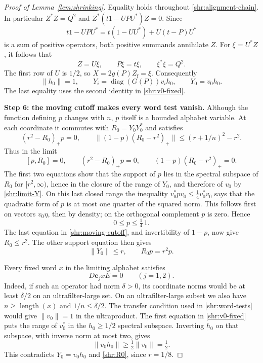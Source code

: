 \begin{proof}[Proof of Lemma~\ref{lem:shrinking}]
Equality holds throughout \eqref{shr:alignment-chain}.  In particular
$Z^*Z=Q^2$ and
$Z^*(t1-UPU^*)Z=0$.  Since
\[
 t1-UPU^*=t(1-UU^*)+U(t-P)U^*
\]
is a sum of positive operators, both positive summands annihilate $Z$.
For $\xi=U^*Z$, it follows that
\begin{equation}\label{shr:alignment}
 Z=U\xi,\qquad P\xi=t\xi,\qquad \xi^*\xi=Q^2.
\end{equation}
The first row of $U$ is $1/2$, so $X=2g(P)Z_{\mathrm f}=\xi$.
Consequently
\begin{equation}\label{shr:limit-Y}
 \|h_0\|=1,\qquad
 Y_i=\operatorname{diag}(G(P))v_i h_0,\qquad
 Y_0=v_0h_0.
\end{equation}
The last equality uses the second identity in \eqref{shr:v0-fixed}.

\medskip
\noindent\textbf{Step 6: the moving cutoff makes every word test vanish.}
Although the function defining $p$ changes with $n$, $p$ itself is a
bounded alphabet variable.  At each coordinate it commutes with
$R_0=Y_0Y_0^*$ and satisfies
\[
 (r^2-R_0)_+p=0,\qquad
 \|(1-p)(R_0-r^2)_+\|\le(r+1/n)^2-r^2.
\]
Thus in the limit
\begin{equation}\label{shr:moving-cutoff}
 [p,R_0]=0,\qquad (r^2-R_0)_+p=0,\qquad
 (1-p)(R_0-r^2)_+=0.
\end{equation}
The first two equations show that the support of $p$ lies in the spectral
subspace of $R_0$ for $[r^2,\infty)$, hence in the closure of the range of
$Y_0$, and therefore of $v_0$ by \eqref{shr:limit-Y}.  On this last closed
range the inequality $v_0^*pv_0\le\frac14v_0^*v_0$ says that the quadratic
form of $p$ is at most one quarter of the squared norm.  This follows
first on vectors $v_0\eta$, then by density; on the orthogonal complement
$p$ is zero.  Hence
\begin{equation}\label{shr:p-small}
 0\le p\le\tfrac14\,1.
\end{equation}
The last equation in \eqref{shr:moving-cutoff}, and invertibility of
$1-p$, now give $R_0\le r^2$.  The other support equation then gives
\begin{equation}\label{shr:R0}
 \|Y_0\|\le r,\qquad R_0p=r^2p.
\end{equation}

Every fixed word $x$ in the limiting alphabet satisfies
\begin{equation}\label{shr:all-word-tests}
 D\mathbf e_jxE=0\qquad(j=1,2).
\end{equation}
Indeed, if such an operator had norm $\delta>0$, its coordinate norms
would be at least $\delta/2$ on an ultrafilter-large set.  On an
ultrafilter-large subset we also have $n\ge\operatorname{length}(x)$ and
$1/n\le\delta/2$.  The transfer condition used in
\eqref{shr:word-tests} would give $\|v_0\|=1$ in the ultraproduct.
The first equation in \eqref{shr:v0-fixed} puts the range of $v_0^*$ in
the $h_0\ge1/2$ spectral subspace.  Inverting $h_0$ on that subspace,
with inverse norm at most two, gives
\[
 \|v_0h_0\|\ge\tfrac12\|v_0\|=\tfrac12.
\]
This contradicts $Y_0=v_0h_0$ and \eqref{shr:R0}, since $r=1/8$.


\end{proof}
